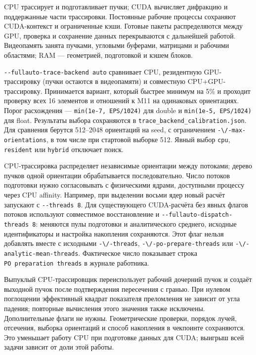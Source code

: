 CPU трассирует и подготавливает пучки; CUDA вычисляет дифракцию и
поддержанные части трассировки. Постоянные рабочие процессы сохраняют
CUDA-контекст и ограниченные кэши. Готовые пакеты распределяются между
GPU, проверка и сохранение данных перекрываются с дальнейшей работой.
Видеопамять занята пучками, угловыми буферами, матрицами и рабочими
областями; RAM --- геометрией, подготовкой и кэшем блоков.

\texttt{-\/-fullauto-trace-backend\ auto} сравнивает CPU, резидентную
GPU-трассировку (пучки остаются в видеопамяти) и совместную
CPU+GPU-трассировку. Принимается вариант, который быстрее минимум на 5\%
и проходит проверку всех 16 элементов и отношений к M11 на одинаковых
ориентациях. Порог расхождения --- \texttt{min(1e-7,\ EPS/1024)} для
double и \texttt{min(1e-5,\ EPS/1024)} для float. Результаты выбора
сохраняются в \nolinkurl{trace_backend_calibration.json}. Для сравнения
берутся 512--2048 ориентаций на seed, с ограничением
\nolinkurl{-\/-max-orientations}, в том числе при стартовой выборке 512.
Явный выбор \texttt{cpu}, \texttt{resident} или \texttt{hybrid}
отключает поиск.

CPU-трассировка распределяет независимые ориентации между потоками;
дерево пучков одной ориентации обрабатывается последовательно. Число
потоков подготовки нужно согласовывать с физическими ядрами, доступными
процессу через CPU affinity. Например, при выделении восьми ядер новый
расчёт запускают с \texttt{-\/-threads\ 8}. Для существующего
CUDA-расчёта без явных флагов потоков используют совместимое
восстановление и \texttt{-\/-fullauto-dispatch-threads\ 8}: меняются
пулы подготовки и аналитического среднего, исходные идентификаторы и
настройка накопления сохраняются. Этот флаг нельзя добавлять вместе с
исходными \nolinkurl{-\/-threads}, \nolinkurl{-\/-po-prepare-threads} или
\nolinkurl{-\/-analytic-mean-threads}. Фактическое число показывает строка
\texttt{PO\ preparation\ threads} в журнале работника.

Выпуклый CPU-трассировщик переиспользует рабочий дочерний пучок и
создаёт выходной пучок после подтверждения пересечения с гранью. При
нулевом поглощении эффективный квадрат показателя преломления не зависит
от угла падения; повторные вычисления этого значения также исключены.
Дополнительные флаги не нужны. Геометрические проверки, порядок лучей,
отсечения, выборка ориентаций и способ накопления в чекпоинте
сохраняются. Это уменьшает работу CPU при подготовке данных для CUDA;
выигрыш всей задачи зависит от доли этой работы.

